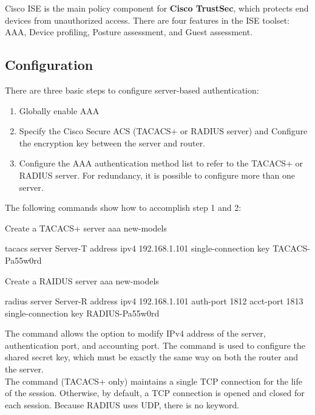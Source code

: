 Cisco ISE is the main policy component for \textbf{Cisco TrustSec}, which protects end devices from unauthorized access. There are four features in the ISE toolset: AAA, Device profiling, Posture assessment, and Guest assessment.

\subsection{Configuration}

There are three basic steps to configure server-based authentication:

\begin{enumerate}
\item Globally enable AAA
\item Specify the Cisco Secure ACS (TACACS+ or RADIUS server) and Configure the encryption key between the server and router.
\item Configure the AAA authentication method list to refer to the TACACS+ or RADIUS server. For redundancy, it is possible to configure more than one server.
\end{enumerate}

The following commands show how to accomplish step 1 and 2:

\begin{sexylisting}{Create a TACACS+ server}
aaa new-models

tacacs server Server-T
  address ipv4 192.168.1.101
  single-connection
  key TACACS-Pa55w0rd
\end{sexylisting}

\begin{sexylisting}{Create a RAIDUS server}
aaa new-models
 
radius server Server-R
  address ipv4 192.168.1.101 auth-port 1812 acct-port 1813
  single-connection
  key RADIUS-Pa55w0rd
\end{sexylisting}

The  command allows the option to modify IPv4 address of the server, authentication port, and accounting port. The  command is used to configure the shared secret key, which must be exactly the same way on both the router and the server.\\

The  command (TACACS+ only) maintains a single TCP connection for the life of the session. Otherwise, by default, a TCP connection is opened and closed for each session. Because RADIUS uses UDP, there is no  keyword.\\

